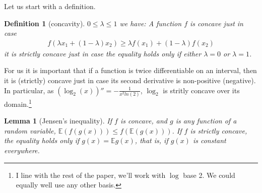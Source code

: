 \documentclass[
  10pt,
  dvipsnames,enabledeprecatedfontcommands]{scrartcl}
\newtheorem{lemma}{Lemma}
\newtheorem{definition}{Definition}        %
\begin{document}
Let us start with a definition.

\begin{definition}[concavity]
$0 \leq \lambda \leq 1$ we have:
A function $f$  is concave just in case
\begin{align*}
f(\lambda x_1 + (1-\lambda)x_2) \geq \lambda f(x_1) + (1-\lambda)f(x_2)
\end{align*}
\noindent it is strictly concave just in case the equality holds only if either $\lambda = 0$ or $\lambda = 1$.
\end{definition}

For us it is important that if a function is twice differentiable on an
interval, then it is (strictly) concave just in case its second
derivative is non-positive (negative). In particular, as
\((\log_2(x))'' = -\frac{1}{x^2 ln(2)}\), \(\log_2\) is stritly concave
over its
domain.\footnote{I line with the rest of the paper, we'll work with $\log$ base 2. We could equally well use any other basis.}

\begin{lemma}[Jensen's inequality]
If $f$ is concave, and $g$ is any function of a random variable, $\mathbb{E}(f(g(x))) \leq f(\mathbb{E}(g(x)))$. If $f$ is 
strictly concave, the equality holds only if $g(x) = \mathbb{E} g(x)$, that is, if $g(x)$ is constant everywhere.
\end{lemma}
\end{document}
